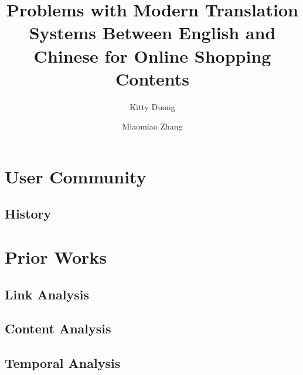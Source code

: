 \documentclass[sigconf]{acmart}
\begin{document}
\title{Problems with Modern Translation Systems Between English and Chinese for Online Shopping Contents}
\author{Kitty Duong}

\author{Miaomiao Zhang}

\begin{abstract}
  
\end{abstract}
\maketitle

\section{User Community}

\subsection{History}

\section{Prior Works}

\subsection{Link Analysis}

\subsection{Content Analysis}

\subsection{Temporal Analysis}



    
\end{document}
